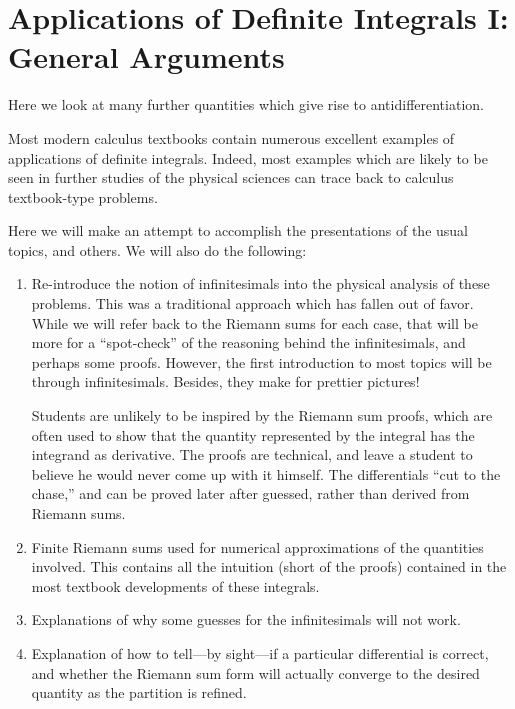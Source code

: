
\chapter{Applications of Definite Integrals I: General Arguments
\label{AppsDefIntegrals}}

Here we look at many further quantities which give rise to 
antidifferentiation.  




Most modern calculus textbooks contain numerous excellent examples
of applications of definite integrals.  Indeed, most examples
which are likely to be seen in further studies of the physical
sciences can trace back to calculus textbook-type problems.

Here we will make an attempt to accomplish the presentations
of the usual topics, and others.  We will also 
do the following:

\begin{enumerate}
\item Re-introduce the notion of infinitesimals into the
physical analysis of these problems.  This was a traditional
approach which has fallen out of favor.  While we will refer
back to the Riemann sums for each case, that will be more
for a ``spot-check'' of the reasoning behind the infinitesimals,
and perhaps some proofs.  However, the first introduction to 
most topics will be through infinitesimals.  Besides, they
make for prettier pictures!

Students are unlikely to be inspired by the Riemann sum proofs,
which are often used to show that the quantity represented
by the integral has the integrand as derivative.  The proofs
are technical, and leave a student to believe he would never
come up with it himself.  The differentials ``cut to the chase,''
and can be proved later after guessed, rather than derived from 
Riemann sums.

\item Finite Riemann sums used for numerical approximations of
the quantities involved.  This contains all the intuition
(short of the proofs) contained in the most textbook developments
of these integrals.

\item Explanations of why some guesses for the infinitesimals
will not work.

\item Explanation of how to tell---by sight---if a particular
differential is correct, and whether the Riemann sum form
will actually converge to the desired quantity as the partition
is refined.
\end{enumerate}





